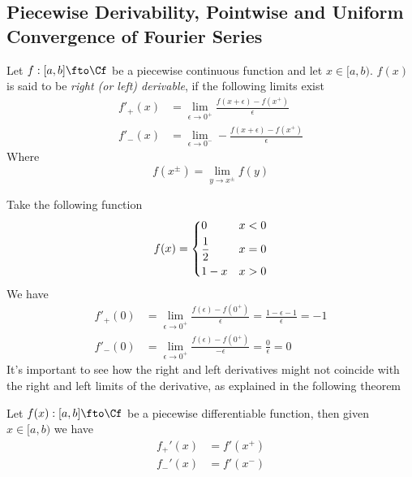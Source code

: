 \documentclass[../mmf.tex]{subfiles}
\begin{document}
\subsection{Piecewise Derivability, Pointwise and Uniform Convergence of Fourier Series}
\begin{dfn}
	Let $f:[a,b]\fto\Cf$ be a piecewise continuous function and let $x\in[a,b)$. $f(x)$ is said to be \textit{right (or left) derivable}, if the following limits exist
	\begin{equation*}
		\begin{aligned}
			f'_+(x)&=\lim_{\epsilon\to0^+}\frac{f(x+\epsilon)-f(x^+)}{\epsilon}\\
			f'_-(x)&=\lim_{\epsilon\to0^-}-\frac{f(x+\epsilon)-f(x^+)}{\epsilon}
		\end{aligned}
	\end{equation*}
	Where
	\begin{equation*}
		f(x^\pm)=\lim_{y\to x^{\pm}}f(y)
	\end{equation*}
\end{dfn}
\begin{eg}
	Take the following function
	\begin{equation*}
		f(x)=\begin{dcases}0&x<0\\\frac{1}{2}&x=0\\1-x&x>0\end{dcases}
	\end{equation*}
	We have
	\begin{equation*}
		\begin{aligned}
			f'_+(0)&=\lim_{\epsilon\to0^+}\frac{f(\epsilon)-f(0^+)}{\epsilon}=\frac{1-\epsilon-1}{\epsilon}=-1\\
			f'_{-}(0)&=\lim_{\epsilon\to0^+}\frac{f(\epsilon)-f(0^+)}{-\epsilon}=\frac{0}{\epsilon}=0
		\end{aligned}
	\end{equation*}
	It's important to see how the right and left derivatives might not coincide with the right and left limits of the derivative, as explained in the following theorem
\end{eg}
\begin{thm}
	Let $f(x):[a,b]\fto\Cf$ be a piecewise differentiable function, then given $x\in[a,b)$ we have
	\begin{equation*}
		\begin{aligned}
			f_+'(x)&= f'(x^+)\\
			f_-'(x)&= f'(x^-)
		\end{aligned}
	\end{equation*}
\end{thm}
\end{document}
